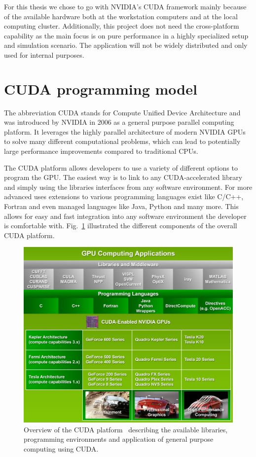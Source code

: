 For this thesis we chose to go with NVIDIA's CUDA framework mainly because of the available hardware both at the workstation computers and at the local computing cluster. Additionally, this project does not need the cross-platform capability as the main focus is on pure performance in a highly specialized setup and simulation scenario. The application will not be widely distributed and only used for internal purposes.

\section{CUDA programming model}
\label{sec:CUDA}
The abbreviation CUDA stands for Compute Unified Device Architecture and was introduced by NVIDIA in 2006 as a general purpose parallel computing platform. It leverages the highly parallel architecture of modern NVIDIA GPUs to solve many different computational problems, which can lead to potentially large performance improvements compared to traditional CPUs.

The CUDA platform allows developers to use a variety of different options to program the GPU. The easiest way is to link to any CUDA-accelerated library and simply using the libraries interfaces from any software environment. For more advanced uses extensions to various programming languages exist like C/C++, Fortran and even managed languages like Java, Python and many more. This allows for easy and fast integration into any software environment the developer is comfortable with. Fig.~\ref{fig:cuda_overview} illustrated the different components of the overall CUDA platform.

\begin{figure}[!htbp]
  \centering
  \includegraphics[width=.9\textwidth]{img/cuda_overview.jpg}
  \caption[Overview of the CUDA platform.]{Overview of the CUDA platform~\cite{CudaProgrammingGuide} describing the available libraries, programming environments and application of general purpose computing using CUDA.}
  \label{fig:cuda_overview}
\end{figure}

